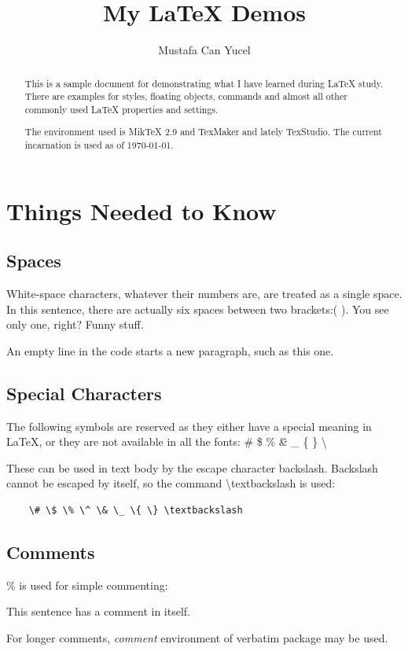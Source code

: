 \documentclass[10pt, a4paper]{article}
\title{My \LaTeX{} Demos}
\author{Mustafa Can Yucel}
\begin{document}
\maketitle
\begin{abstract}
This is a sample document for demonstrating what I have learned during \LaTeX{} study. There are examples for styles, floating objects, commands and almost all other commonly used \LaTeX{}  properties and settings.

The environment used is MikTeX 2.9 and TexMaker and lately TexStudio. The current incarnation \LaTeXe{} is used as of \today.
\end{abstract}
\newpage
\tableofcontents
\newpage
\section{Things Needed to Know}
\subsection{Spaces}
White-space characters, whatever their numbers are, are treated as a single space. In this sentence, there are actually six spaces between two brackets:(      ). You see only one, right? Funny stuff.

An empty line in the code starts a new paragraph, such as this one.
\subsection{Special Characters}
The following symbols are reserved as they either have a special meaning in \LaTeX{}, or they are not available in all the fonts: \# \$ \% \^ \& \_ \{ \} \textbackslash

These can be used in text body by the escape character backslash. Backslash cannot be escaped by itself, so the command \textbackslash textbackslash is used: 
\begin{verbatim}
	\# \$ \% \^ \& \_ \{ \} \textbackslash
\end{verbatim}

\subsection{Comments}
\% is used for simple commenting:

This sentence %
has a comment in itself.

For longer comments, \textsl{comment} environment of verbatim package may be used.
\end{document}
